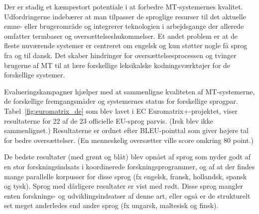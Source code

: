 \begin{multicols}{2}

Der er stadig et k\ae mpestort potentiale i at forbedre MT-systemernes kvalitet. Udfordringerne indeb\ae rer at man tilpasser de sproglige resurser til det aktuelle emne- eller brugeromr\aa de og integrerer teknologien i arbejdsgange der allerede omfatter termbaser og overs\ae ttelseshukommelser. Et andet problem er at de fleste nuv\ae rende sy\-stemer er centreret om engelsk og kun st\o tter nogle \mbox{f\aa} sprog fra og til dansk. Det skaber hindringer for overs\ae ttelsesprocessen og tvinger brugerne af MT til at l\ae re forskellige leksikalske kodningsv\ae rkt\o jer for de forskellige systemer. 

Evalueringskampagner hj\ae lper med at sammenligne kvaliteten af MT-systemerne, de forskellige fremgangsm\aa der og systemernes status for forskellige sprogpar. Tabel~\ref{fig:euromatrix_de} som blev lavet i EC Euromatrix+-projektet, viser resultaterne for 22 af de 23 officielle EU-sprog parvis. (Irsk blev ikke sammenlignet.) Resultaterne er ordnet efter BLEU-pointtal \cite{bleu1} som giver h\o jere tal for bedre overs\ae ttelser.   (En menneskelig overs\ae tter ville score omkring 80 point.)

De bedste resultater (med gr\o nt og bl\aa t) blev opn\aa et af sprog som nyder godt af en stor forskningsindsats i koordinerede forskningsprogrammer, og af at der findes mange parallelle korpusser for disse sprog (fx engelsk, fransk, hollandsk, spansk og tysk). Sprog med d\aa rligere resultater er vist med r\o dt. Disse sprog mangler enten forsknings- og udviklingsindsatser af denne art, eller \mbox{ogs\aa} er de strukturelt set meget anderledes end andre sprog (fx ungarsk, maltesisk og finsk).



\end{multicols}

